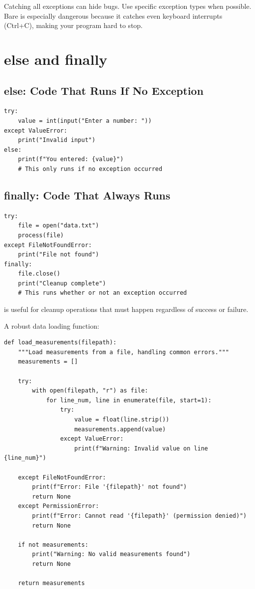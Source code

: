 \begin{warning}
Catching all exceptions can hide bugs. Use specific exception types when possible. Bare  is especially dangerous because it catches even keyboard interrupts (Ctrl+C), making your program hard to stop.
\end{warning}

\section{else and finally}
\label{sec:else-finally}

\subsection{else: Code That Runs If No Exception}

\begin{lstlisting}
try:
    value = int(input("Enter a number: "))
except ValueError:
    print("Invalid input")
else:
    print(f"You entered: {value}")
    # This only runs if no exception occurred
\end{lstlisting}

\subsection{finally: Code That Always Runs}

\begin{lstlisting}
try:
    file = open("data.txt")
    process(file)
except FileNotFoundError:
    print("File not found")
finally:
	file.close() 
    print("Cleanup complete")
    # This runs whether or not an exception occurred
\end{lstlisting}

 is useful for cleanup operations that must happen regardless of success or failure.

\begin{labexample}
A robust data loading function:

\begin{lstlisting}
def load_measurements(filepath):
    """Load measurements from a file, handling common errors."""
    measurements = []

    try:
        with open(filepath, "r") as file:
            for line_num, line in enumerate(file, start=1):
                try:
                    value = float(line.strip())
                    measurements.append(value)
                except ValueError:
                    print(f"Warning: Invalid value on line {line_num}")

    except FileNotFoundError:
        print(f"Error: File '{filepath}' not found")
        return None
    except PermissionError:
        print(f"Error: Cannot read '{filepath}' (permission denied)")
        return None

    if not measurements:
        print("Warning: No valid measurements found")
        return None

    return measurements
\end{lstlisting}
\end{labexample}

